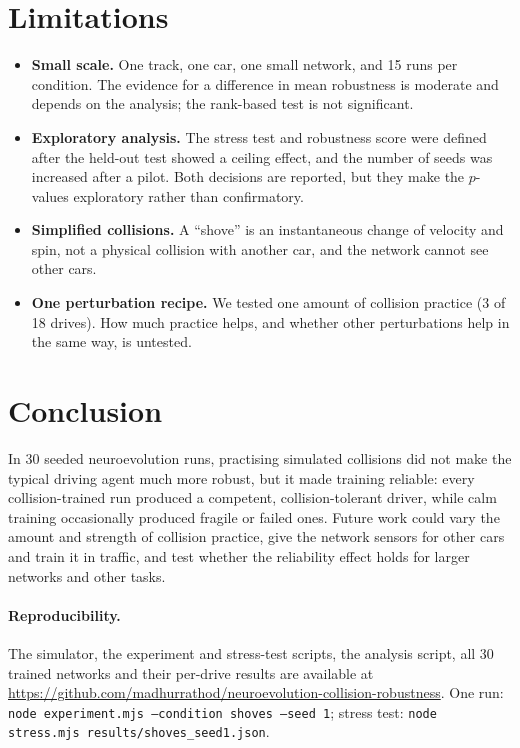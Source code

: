 \documentclass[11pt,a4paper]{article}
\begin{document}
\section{Limitations}
\begin{itemize}
  \item \textbf{Small scale.} One track, one car, one small network, and 15 runs per condition. The evidence for a difference in mean robustness is moderate and depends on the analysis; the rank-based test is not significant.
  \item \textbf{Exploratory analysis.} The stress test and robustness score were defined after the held-out test showed a ceiling effect, and the number of seeds was increased after a pilot. Both decisions are reported, but they make the $p$-values exploratory rather than confirmatory.
  \item \textbf{Simplified collisions.} A ``shove'' is an instantaneous change of velocity and spin, not a physical collision with another car, and the network cannot see other cars.
  \item \textbf{One perturbation recipe.} We tested one amount of collision practice (3 of 18 drives). How much practice helps, and whether other perturbations help in the same way, is untested.
\end{itemize}

\section{Conclusion}
In 30 seeded neuroevolution runs, practising simulated collisions did not make the typical driving agent much more robust, but it made training reliable: every collision-trained run produced a competent, collision-tolerant driver, while calm training occasionally produced fragile or failed ones. Future work could vary the amount and strength of collision practice, give the network sensors for other cars and train it in traffic, and test whether the reliability effect holds for larger networks and other tasks.

\paragraph{Reproducibility.} The simulator, the experiment and stress-test scripts, the analysis script, all 30 trained networks and their per-drive results are available at \url{https://github.com/madhurrathod/neuroevolution-collision-robustness}. One run: \texttt{node experiment.mjs --condition shoves --seed 1}; stress test: \texttt{node stress.mjs results/shoves\_seed1.json}.
\end{document}

